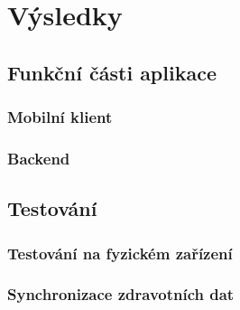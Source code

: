 \chapter{Výsledky}

\section{Funkční části aplikace}

\subsection{Mobilní klient}

\subsection{Backend}

\section{Testování}

\subsection{Testování na fyzickém zařízení}

\subsection{Synchronizace zdravotních dat}